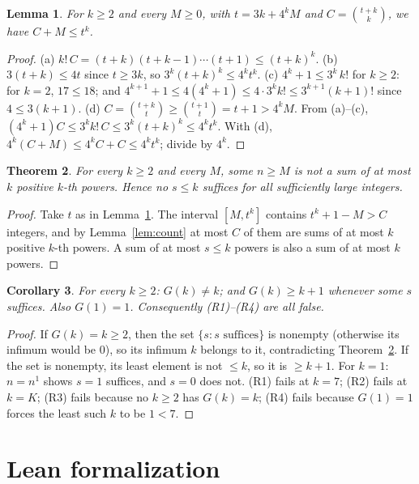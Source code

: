 \documentclass[11pt]{article}
\renewcommand{\_}{\oldus\allowbreak}
\newtheorem{theorem}{Theorem}
\newtheorem{lemma}[theorem]{Lemma}
\newtheorem{corollary}[theorem]{Corollary}
\theoremstyle{definition}
\begin{document}
\begin{lemma}\label{lem:ineq}
For $k \ge 2$ and every $M \ge 0$, with $t = 3k + 4^k M$ and $C = \binom{t+k}{k}$, we have $C + M \le
t^k$.
\end{lemma}
\begin{proof}
(a) $k!\, C = (t+k)(t+k-1)\cdots(t+1) \le (t+k)^k$. (b) $3(t+k) \le 4t$ since $t \ge 3k$, so
$3^k (t+k)^k \le 4^k t^k$. (c) $4^k + 1 \le 3^k\, k!$ for $k \ge 2$: for $k = 2$, $17 \le 18$; and
$4^{k+1} + 1 \le 4(4^k+1) \le 4 \cdot 3^k k! \le 3^{k+1}(k+1)!$ since $4 \le 3(k+1)$. (d) $C =
\binom{t+k}{t} \ge \binom{t+1}{t} = t+1 > 4^k M$. From (a)--(c), $(4^k+1) C \le 3^k k!\, C \le 3^k
(t+k)^k \le 4^k t^k$. With (d), $4^k (C + M) \le 4^k C + C \le 4^k t^k$; divide by $4^k$.
\end{proof}

\begin{theorem}\label{thm:key}
For every $k \ge 2$ and every $M$, some $n \ge M$ is not a sum of at most $k$ positive $k$-th powers.
Hence no $s \le k$ suffices for all sufficiently large integers.
\end{theorem}
\begin{proof}
Take $t$ as in Lemma~\ref{lem:ineq}. The interval $[M, t^k]$ contains $t^k + 1 - M > C$ integers, and by
Lemma~\ref{lem:count} at most $C$ of them are sums of at most $k$ positive $k$-th powers. A sum of at
most $s \le k$ powers is also a sum of at most $k$ powers.
\end{proof}

\begin{corollary}\label{cor:main}
For every $k \ge 2$: $G(k) \ne k$; and $G(k) \ge k+1$ whenever some $s$ suffices. Also $G(1) = 1$.
Consequently (R1)--(R4) are all false.
\end{corollary}
\begin{proof}
If $G(k) = k \ge 2$, then the set $\{s : \text{$s$ suffices}\}$ is nonempty (otherwise its infimum would
be $0$), so its infimum $k$ belongs to it, contradicting Theorem~\ref{thm:key}. If the set is nonempty,
its least element is not $\le k$, so it is $\ge k+1$. For $k = 1$: $n = n^1$ shows $s = 1$ suffices, and
$s = 0$ does not. (R1) fails at $k = 7$; (R2) fails at $k = K$; (R3) fails because no $k \ge 2$ has $G(k) =
k$; (R4) fails because $G(1) = 1$ forces the least such $k$ to be $1 < 7$.
\end{proof}

\section{Lean formalization}\label{sec:lean}
\end{document}
